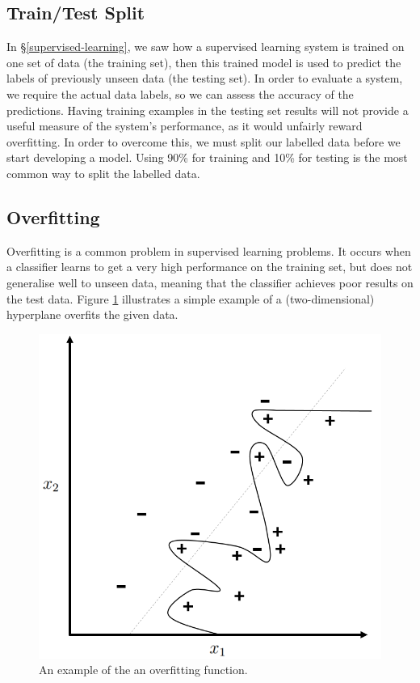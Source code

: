 \documentclass[12pt,a4paper,twoside,openright]{report}
\begin{document}
\subsection{Train/Test Split} \label{train-test-split}
In \S\ref{supervised-learning}, we saw how a supervised learning system is trained on one set of data (the training set), then this trained model is used to predict the labels of previously unseen data (the testing set). In order to evaluate a system, we require the actual data labels, so we can assess the accuracy of the predictions. Having training examples in the testing set results will not provide a useful measure of the system's performance, as it would unfairly reward overfitting. In order to overcome this, we must split our labelled data before we start developing a model. Using 90\% for training and 10\% for testing is the most common way to split the labelled data.
\subsection{Overfitting} \label{prep-overfitting}

Overfitting is a common problem in supervised learning problems. It occurs when a classifier learns to get a very high performance on the training set, but does not generalise well to unseen data, meaning that the classifier achieves poor results on the test data. Figure \ref{fig:overfitting} illustrates a simple example of a (two-dimensional) hyperplane overfits the given data.
\begin{figure}
	\begin{center}
		\includegraphics[scale=0.6]{figs/overfitting.png}
	\end{center}
	\caption{An example of the an overfitting function.}
	\label{fig:overfitting}
\end{figure}
\end{document}
